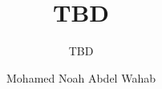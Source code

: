 \makeatletter %
\makeatother

\title{TBD}
\subtitle{TBD}
\author{Mohamed Noah Abdel Wahab}


\newtheorem{definition}{Definition}[chapter]
\newtheorem{theorem}[definition]{Theorem}
\newtheorem*{note}{Note}
\newtheorem*{problem}{Problem}